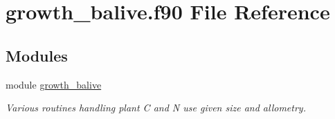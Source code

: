 \hypertarget{growth__balive_8f90}{}\section{growth\+\_\+balive.\+f90 File Reference}
\label{growth__balive_8f90}
\subsection*{Modules}
\begin{DoxyCompactItemize}
\item 
module \hyperlink{namespacegrowth__balive}{growth\+\_\+balive}
\begin{DoxyCompactList}\small\item\em Various routines handling plant C and N use given size and allometry. \end{DoxyCompactList}\end{DoxyCompactItemize}
